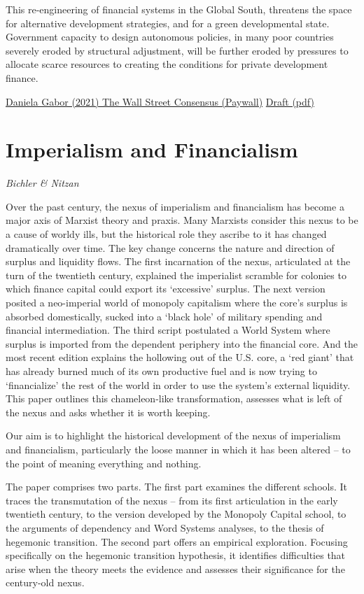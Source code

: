 \documentclass[
]{book}
\begin{document}
This re-engineering of financial systems in the Global South, threatens the space for
alternative development strategies, and for a green developmental state. Government
capacity to design autonomous policies, in many poor countries severely eroded by
structural adjustment, will be further eroded by pressures to allocate scarce resources
to creating the conditions for private development finance.

\href{https://onlinelibrary.wiley.com/doi/abs/10.1111/dech.12645}{Daniela Gabor (2021) The Wall Street Consensus (Paywall)}
\href{pdf/Gabor_2021_Wall_Street_Consensus.pdf}{Draft (pdf)}

\hypertarget{imperialism-and-financialism}{%
\section{Imperialism and Financialism}\label{imperialism-and-financialism}}

\emph{Bichler \& Nitzan}

Over the past century, the nexus of imperialism and financialism has become a major axis
of Marxist theory and praxis. Many Marxists consider this nexus to be a cause of worldy
ills, but the historical role they ascribe to it has changed dramatically over time. The key
change concerns the nature and direction of surplus and liquidity flows. The first
incarnation of the nexus, articulated at the turn of the twentieth century, explained the
imperialist scramble for colonies to which finance capital could export its `excessive'
surplus. The next version posited a neo-imperial world of monopoly capitalism where the
core's surplus is absorbed domestically, sucked into a `black hole' of military spending
and financial intermediation. The third script postulated a World System where surplus is
imported from the dependent periphery into the financial core. And the most recent
edition explains the hollowing out of the U.S. core, a `red giant' that has already burned
much of its own productive fuel and is now trying to `financialize' the rest of the world in
order to use the system's external liquidity. This paper outlines this chameleon-like
transformation, assesses what is left of the nexus and asks whether it is worth keeping.

Our aim is to highlight the historical development of the
nexus of imperialism and financialism,
particularly the loose manner in which it has been altered --
to the point of meaning everything and nothing.

The paper comprises two parts. The first part examines the different schools. It
traces the transmutation of the nexus -- from its first articulation in the early twentieth
century, to the version developed by the Monopoly Capital school, to the arguments of
dependency and Word Systems analyses, to the thesis of hegemonic transition. The
second part offers an empirical exploration. Focusing specifically on the hegemonic
transition hypothesis, it identifies difficulties that arise when the theory meets the
evidence and assesses their significance for the century-old nexus.
\end{document}
